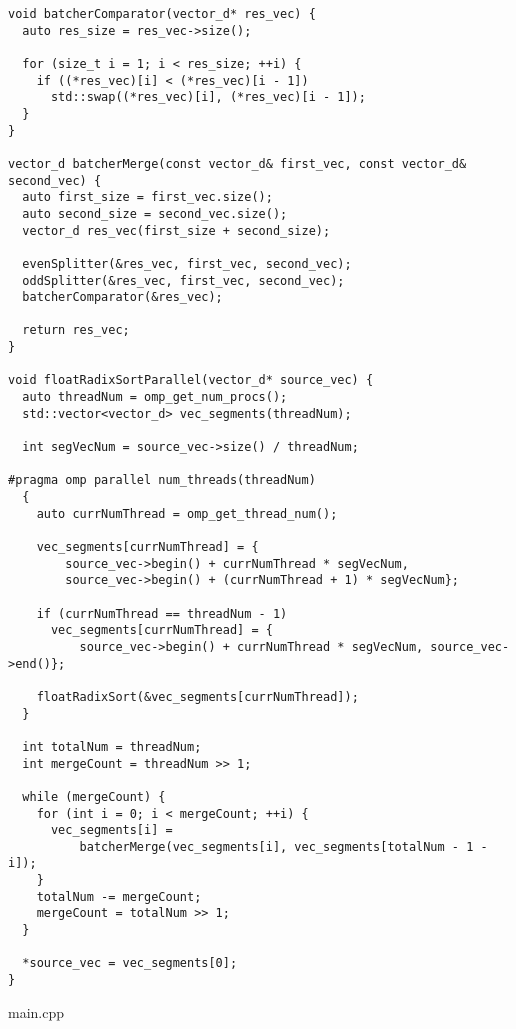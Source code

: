 \documentclass{report}
\begin{document}
\begin{lstlisting}
void batcherComparator(vector_d* res_vec) {
  auto res_size = res_vec->size();

  for (size_t i = 1; i < res_size; ++i) {
    if ((*res_vec)[i] < (*res_vec)[i - 1])
      std::swap((*res_vec)[i], (*res_vec)[i - 1]);
  }
}

vector_d batcherMerge(const vector_d& first_vec, const vector_d& second_vec) {
  auto first_size = first_vec.size();
  auto second_size = second_vec.size();
  vector_d res_vec(first_size + second_size);

  evenSplitter(&res_vec, first_vec, second_vec);
  oddSplitter(&res_vec, first_vec, second_vec);
  batcherComparator(&res_vec);

  return res_vec;
}

void floatRadixSortParallel(vector_d* source_vec) {
  auto threadNum = omp_get_num_procs();
  std::vector<vector_d> vec_segments(threadNum);

  int segVecNum = source_vec->size() / threadNum;

#pragma omp parallel num_threads(threadNum)
  {
    auto currNumThread = omp_get_thread_num();

    vec_segments[currNumThread] = {
        source_vec->begin() + currNumThread * segVecNum,
        source_vec->begin() + (currNumThread + 1) * segVecNum};

    if (currNumThread == threadNum - 1)
      vec_segments[currNumThread] = {
          source_vec->begin() + currNumThread * segVecNum, source_vec->end()};

    floatRadixSort(&vec_segments[currNumThread]);
  }

  int totalNum = threadNum;
  int mergeCount = threadNum >> 1;

  while (mergeCount) {
    for (int i = 0; i < mergeCount; ++i) {
      vec_segments[i] =
          batcherMerge(vec_segments[i], vec_segments[totalNum - 1 - i]);
    }
    totalNum -= mergeCount;
    mergeCount = totalNum >> 1;
  }

  *source_vec = vec_segments[0];
}
\end{lstlisting}
\par main.cpp
\end{document}
